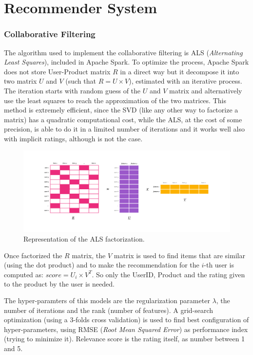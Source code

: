 \documentclass[fleqn,10pt]{SelfArx}
\begin{document}
\newpage
\part{Recommender System}
\section{Collaborative Filtering}
The algorithm used to implement the collaborative filtering is ALS (\textit{Alternating Least Squares}), included in Apache Spark.
To optimize the process, Apache Spark does not store User-Product matrix $R$ in a direct way but it decompose it into two matrix $U$ and $V$ (such that $R = U \times V$), estimated with an iterative process.
The iteration starts with random guess of the $U$ and $V$ matrix and alternatively use the least squares to reach the approximation of the two matrices.
This method is extremely efficient, since the SVD (like any other way to factorize a matrix) has a quadratic computational cost, while the ALS, at the cost of some precision, is able to do it in a limited number of iterations and it works well also with implicit ratings, although is not the case.
\begin{figure}[!h]
    \includegraphics[width=\linewidth]{als.png}
    \caption{Representation of the ALS factorization.}
    \label{fig:als}
\end{figure}

Once factorized the $R$ matrix, the $V$ matrix is used to find items that are similar (using the dot product) and to make the recommendation for the $i$-th user is computed as: $score = U_i \times V^T$.
So only the UserID, Product and the rating given to the product by the user is needed.

The hyper-paramters of this models are the regularization parameter $\lambda$, the number of iterations and the rank (number of features).
A grid-search optimization (using a 3-folds cross validation) is used to find best configuration of hyper-parameters, using RMSE (\textit{Root Mean Squared Error}) as performance index (trying to minimize it).
Relevance score is the rating itself, as number between 1 and 5.
\end{document}
